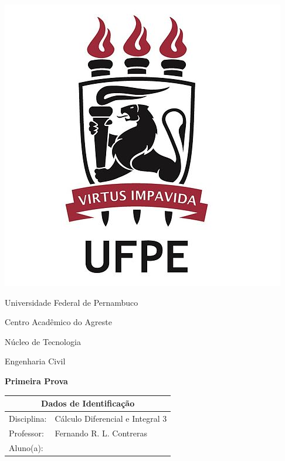 \documentclass[oneside,a4paper,12pt]{article}
\newcommand{\universidade}{Universidade Federal de Pernambuco}
\newcommand{\centro}{Centro Acadêmico do Agreste}
\newcommand{\departamento}{Núcleo de Tecnologia}
\newcommand{\curso}{Engenharia Civil}
\newcommand{\professor}{Fernando R. L. Contreras}
\newcommand{\disciplina}{Cálculo Diferencial e Integral 3}
\begin{document}
	\pagestyle{empty}
	
	\begin{center}
	\includegraphics[width=\linewidth/6]{logoUFPE.jpg}%
	 	\vspace{0pt}
	 	
		\universidade
		\par
		\centro
		\par
		\departamento
		\par
		\curso
		\par
		\vspace{08pt}
		\large \textbf{Primeira Prova}
		
	\end{center}
	
	\vspace{1pt}
	
	\begin{tabular}{ |l|p{12cm}| }
		
		\hline
		\multicolumn{2}{|c|}{\textbf{Dados de Identificação}} \\
			\hline
		Disciplina:        &    \disciplina          \\
		\hline
		Professor:         &    \professor           \\
	\hline
	Aluno(a):         &\\
	
		\hline
	\end{tabular}
	
\end{document}
